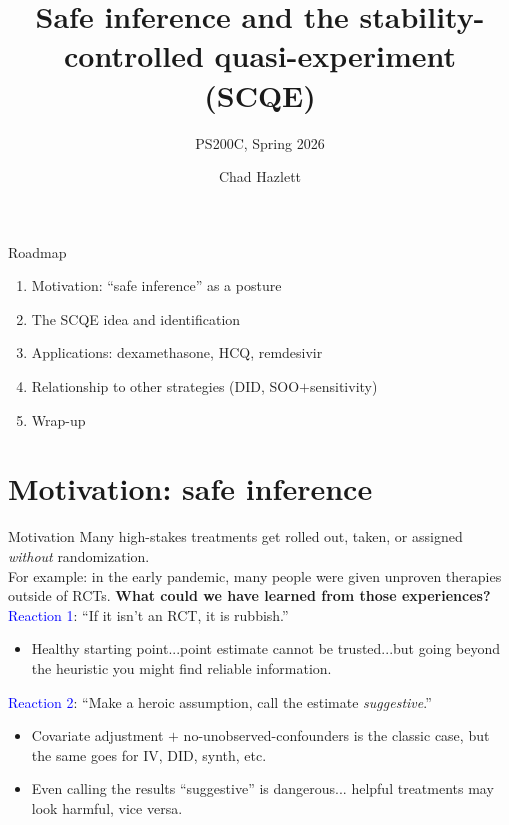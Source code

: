 \documentclass[xcolor=dvipsnames]{beamer}
\title[SCQE]{Safe inference and the stability-controlled quasi-experiment (SCQE)}
\subtitle[ ]{PS200C, Spring 2026}
\author[Hazlett]{Chad Hazlett}
\institute[UCLA]{UCLA\\[1ex]\texttt{chazlett@ucla.edu}}
\date{}
\newcommand\makegaps{\addtolength{\itemsep}{.25\baselineskip}}
\begin{document}
\subject{Talks}

\begin{frame}
  \titlepage
\end{frame}

\begin{frame}{Roadmap}
\begin{enumerate}\makegaps
  \item Motivation: ``safe inference'' as a posture
  \item The SCQE idea and identification
  \item Applications: dexamethasone, HCQ, remdesivir
  \item Relationship to other strategies (DID, SOO$+$sensitivity)
  \item Wrap-up
\end{enumerate}
\end{frame}

\section{Motivation: safe inference}

\begin{frame}{Motivation}
 Many high-stakes treatments get rolled out, taken, or assigned \emph{without} randomization.\\
\medskip
For example: in the early pandemic, many people were given unproven therapies outside of RCTs. \textbf{What could we have learned from those experiences?}\\
\bigskip
{} \textcolor{blue}{Reaction 1}: ``If it isn't an RCT, it is rubbish.''\\
\small
\begin{itemize}
\item Healthy starting point...point estimate cannot be trusted...but going beyond the heuristic you might find reliable information.
\end{itemize}
\medskip
\normalsize
{} \textcolor{blue}{Reaction 2}: ``Make a heroic assumption, call the estimate \emph{suggestive}.''\\
\small
\begin{itemize}
  \item Covariate adjustment $+$ no-unobserved-confounders is the classic case, but the same goes for IV, DID, synth, etc.
  \item Even calling the results ``suggestive'' is dangerous... helpful treatments may look harmful, vice versa.
\end{itemize}
\end{frame}
\end{document}
